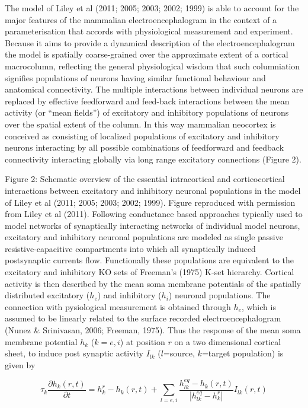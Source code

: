 \documentclass[a4paper,12pt]{article}
\begin{document}
The model of Liley et al (2011; 2005; 2003; 2002; 1999) is able to
account for the major features of the mammalian
electroencephalogram in the context of a parameterisation that
accords with physiological measurement and experiment. Because it
aims to provide a dynamical description of the electroencephalogram
the model is spatially coarse-grained over the approximate extent of a
cortical macrocolumn, reflecting the general physiological wisdom that
such columniation signifies populations of neurons having similar
functional behaviour and anatomical connectivity. The multiple
interactions between individual neurons are replaced by effective feedforward
and feed-back interactions between the mean activity (or
“mean fields”) of excitatory and inhibitory populations of neurons over
the spatial extent of the column. In this way mammalian neocortex is
conceived as consisting of localized populations of excitatory and
inhibitory neurons interacting by all possible combinations of
feedforward and feedback connectivity interacting globally via long
range excitatory connections (Figure 2).

Figure 2: Schematic overview of the essential intracortical and corticocortical
interactions between excitatory and inhibitory neuronal
populations in the model of Liley et al (2011; 2005; 2003; 2002;
1999). Figure reproduced with permission from Liley et al (2011).
Following conductance based approaches typically used to model
networks of synaptically interacting networks of individual model
neurons, excitatory and inhibitory neuronal populations are modeled as
single passive resistive-capacitive compartments into which all
synaptically induced postsynaptic currents flow. Functionally these
populations are equivalent to the excitatory and inhibitory KO sets of
Freeman’s (1975) K-set hierarchy. Cortical activity is then described
by the mean soma membrane potentials of the spatially distributed excitatory ($h_e$)
and inhibitory ($h_i$) neuronal populations. The connection with pysiological measurement is obtained through $h_e$,
which is
assumed to be linearly related to the surface recorded
electroencephalogram (Nunez \& Srinivasan, 2006; Freeman, 1975).
Thus the response of the mean soma membrane potential $h_k$ ($k=e,i$) at position $r$ on a two dimensional cortical
sheet, to induce post synaptic activity $I_{lk}$ ($l$=source, $k$=target population) is given by

\begin{equation} \label{eq:h_k} 
\tau_k\frac{\partial h_k(r,t)}{\partial t} = h^r_k - h_k(r,t) + \sum_{l=e,i} \frac{h_{lk}^{eq} - h_k(r, t)}{\left|
h_{lk}^{eq}-h_k^r\right|}I_{lk}(r,t)
\end{equation}
\end{document}
